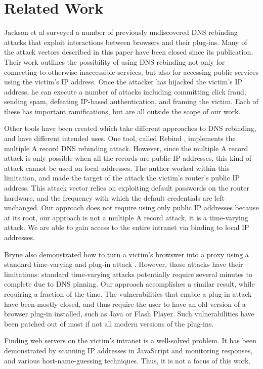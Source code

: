 \section{Related Work}
\label{sec:related}


Jackson et al \cite{protectFromDNS} surveyed a number of previously undiscovered DNS rebinding attacks that exploit interactions between browsers and their plug-ins. Many of the attack vectors described in this paper have been closed since its publication. Their work outlines the possibility of using DNS rebinding not only for connecting to otherwise inaccessible services, but also for accessing public services using the victim's IP address. Once the attacker has hijacked the victim's IP address, he can execute a number of attacks including committing click fraud, sending spam, defeating IP-based authentication, and framing the victim. Each of these has important ramifications, but are all outside the scope of our work.

Other tools have been created which take different approaches to DNS rebinding, and have different intended uses. One tool, called Rebind \cite{rebind}, implements the multiple A record DNS rebinding attack. However, since the multiple A record attack is only possible when all the records are public IP addresses, this kind of attack cannot be used on local addresses. The author worked within this limitation, and made the target of the attack the victim's router's public IP address. This attack vector relies on exploiting default passwords on the router hardware, and the frequency with which the default credentials are left unchanged. Our approach does not require using only public IP addresses because at its root, our approach is not a multiple A record attack, it is a time-varying attack.  We are able to gain access to the entire intranet via binding to local IP addresses.

Bryne also demonstrated how to turn a victim's browswer into a proxy using a standard time-varying and plug-in attack \cite{blackhat}. However, those attacks have their limitations: standard time-varying attacks potentially require several minutes to complete due to DNS pinning. Our approach accomplishes a similar result, while requiring a fraction of the time. The vulnerabilities that enable a plug-in attack have been mostly closed, and thus require the user to have an old version of a browser plug-in installed, such as Java or Flash Player. Such vulnerabilities have been patched out of most if not all modern versions of the plug-ins.

Finding web servers on the victim's intranet is a well-solved problem. It has been demonstrated by scanning IP addresses in JavaScript and monitoring responses\cite{grossman}, and various host-name-guessing techniques\cite{protectFromDNS}. Thus, it is not a focus of this work.



